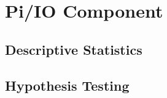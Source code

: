 \begin{table}[]
\begin{tabu}{r|cccc}
\end{tabu}
\end{table}







\section{Pi/IO Component}
\label{section:analysis-piiocomponent}


\subsection{Descriptive Statistics}

\subsection{Hypothesis Testing}